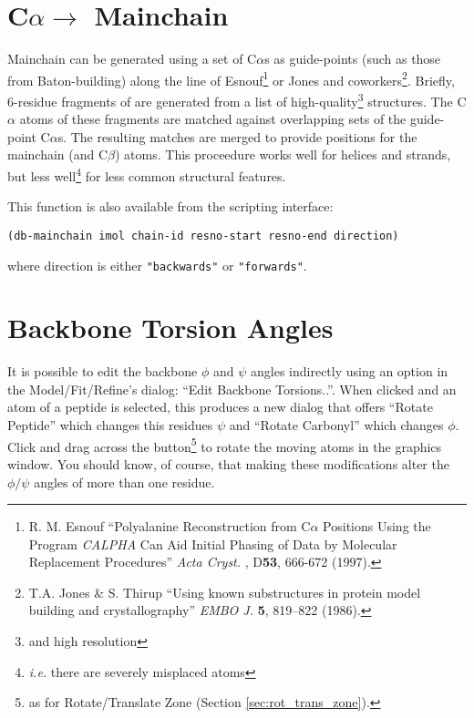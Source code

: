 \documentclass{book}
\begin{document}
\section{C$\alpha \rightarrow$ Mainchain}
 Mainchain can be generated using a set of C$\alpha$s
as guide-points (such as those from Baton-building) along the line of
Esnouf\footnote{R. M. Esnouf ``Polyalanine Reconstruction from
  C$\alpha$ Positions Using the Program \emph{CALPHA} Can Aid Initial
  Phasing of Data by Molecular Replacement Procedures'' \emph{Acta
    Cryst. }, D\textbf{53}, 666-672 (1997).} or Jones and
coworkers\footnote{T.A.  Jones \& S. Thirup ``Using known
  substructures in protein model building and crystallography''
  \emph{EMBO J.} \textbf{5}, 819--822 (1986).}.  Briefly, 6-residue
fragments of are generated from a list of high-quality\footnote{and
  high resolution} structures. The C$\alpha$ atoms of these fragments
are matched against overlapping sets of the guide-point C$\alpha$s.
The resulting matches are merged to provide positions for the
mainchain (and C$\beta$) atoms.  This proceedure works well for
helices and strands, but less well\footnote{\emph{i.e.}  there are
  severely misplaced atoms} for less common structural features.

This function is also available from the scripting interface:

\texttt{(db-mainchain imol chain-id resno-start resno-end direction)}
    
where direction is either \texttt{"backwards"} or \texttt{"forwards"}.

%

\section{Backbone Torsion Angles}
It is possible to edit the backbone $\phi$ and $\psi$ angles
indirectly using an option in the Model/Fit/Refine's dialog: ``Edit
Backbone Torsions..''. When clicked and an atom of a peptide is
selected, this produces a new dialog that offers ``Rotate Peptide''
which changes this residues $\psi$ and ``Rotate Carbonyl'' which
changes $\phi$.  Click and drag across the button\footnote{as for
  Rotate/Translate Zone (Section \ref{sec:rot_trans_zone}).} to rotate
the moving atoms in the graphics window.  You should know, of course,
that making these modifications alter the $\phi/\psi$ angles of more
than one residue.
\end{document}
